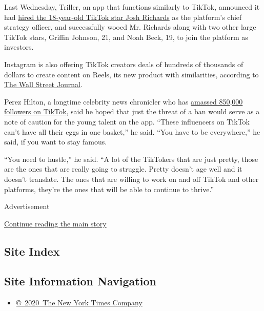 Last Wednesday, Triller, an app that functions similarly to TikTok,
announced it had
\href{https://www.businessinsider.com/triller-names-tiktok-star-josh-richards-strategy-head-seeks-funding-2020-7}{hired
the 18-year-old TikTok star Josh Richards} as the platform's chief
strategy officer, and successfully wooed Mr. Richards along with two
other large TikTok stars, Griffin Johnson, 21, and Noah Beck, 19, to
join the platform as investors.

Instagram is also offering TikTok creators deals of hundreds of
thousands of dollars to create content on Reels, its new product with
similarities, according to
\href{https://www.wsj.com/articles/facebook-seeks-to-reel-in-tiktok-creators-raising-stakes-in-social-media-rivalry-11595928600?mod=hp_lead_pos3}{The
Wall Street Journal}.

Perez Hilton, a longtime celebrity news chronicler who has
\href{https://www.tiktok.com/@perezhilton}{amassed 850,000 followers on
TikTok}, said he hoped that just the threat of a ban would serve as a
note of caution for the young talent on the app. ``These influencers on
TikTok can't have all their eggs in one basket,'' he said. ``You have to
be everywhere,'' he said, if you want to stay famous.

``You need to hustle,'' he said. ``A lot of the TikTokers that are just
pretty, those are the ones that are really going to struggle. Pretty
doesn't age well and it doesn't translate. The ones that are willing to
work on and off TikTok and other platforms, they're the ones that will
be able to continue to thrive.''

Advertisement

\protect\hyperlink{after-bottom}{Continue reading the main story}

\hypertarget{site-index}{%
\subsection{Site Index}\label{site-index}}

\hypertarget{site-information-navigation}{%
\subsection{Site Information
Navigation}\label{site-information-navigation}}

\begin{itemize}
\tightlist
\item
  \href{https://help.nytimes3xbfgragh.onion/hc/en-us/articles/115014792127-Copyright-notice}{©~2020~The
  New York Times Company}
\end{itemize}

